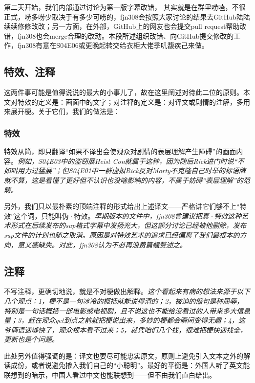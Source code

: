 \documentclass{ctexart}
\begin{document}
第二天开始，我们内部通过讨论为第一版字幕改错，{\color{red} 其实就是在群里唠嗑，不很正式，唠多唠少取决于有多少可唠的}，fjn308会按照大家讨论的结果去GitHub陆陆续续修修改改；另一方面，在外部，GitHub上的网友也会提交pull request帮助改错，fjn308也会merge合理的改动。本段所述组织改错、向GitHub提交修改的工作，fjn308有意在S04E06或更晚起转交给衣柜大佬季叽馥疾己来做。

\subsection{特效、注释}

这两件事可能是值得说说的最大的小事儿了，故在这里阐述对待此二位的原则。本文对特效的定义是：画面中的文字；对注释的定义是：对译文或剧情的注解，多用来展开梗。关于它们，我们的做法是：

\subsubsection{特效}

特效从简，即只翻译“如果不译出会使观众对剧情的表层理解产生障碍”的画面内容。\emph{\small 例如，S04E03中的盗窃展Heist Con就属于这种，因为随后Rick进门时说“不如叫用力过猛展”；但S04E01中一群虚拟Rick反对Morty不克隆自己时举的标语牌就不算，这是看懂了更好但不认识也没啥影响的内容，不属于妨碍“表层理解”的范畴。}

另外，我们只以最朴素的顶端注释的形式给出上述译文——严格讲它们够不上“特效”这个词，只能叫伪·特效。\emph{\small 早期版本的文件中，fjn308曾建议把真·特效这种艺术形式在后续发布的sup格式字幕中发扬光大，但这部分讨论已经被他删除，发布sup文件的计划也随之取消。原因是对特效艺术的追求已经偏离了我们最根本的方向，意义感缺失。对此，fjn308认为不必再浪费篇幅赘述之。}

\subsection{注释}

不写注释，更确切地说，就是不对梗做出解释。\emph{\small 这个看起来有病的想法来源于以下几个观点：1，梗不是一句冰冷的概括就能说得清的；2，被迫的缩句是种屈辱，特别是一句话概括一部电影或电视剧，且不说这也不能给没看过的人带来多大信息量；3，赶在观众get到点之前就把梗说出来，多妙的梗都会瞬间变得无趣；4，这爷俩语速够快了，观众根本看不过来；5，就凭咱们几个找，很难把梗快速找全，更新也是个问题。}

{\color{red} 此处另外值得强调的是：译文也要尽可能忠实原文，原则上避免引入文本之外的解读成份，或者说避免掺入我们自己的“小聪明”。最好的平衡是：外国人听了英文能联想到的暗示，中国人看过中文也能联想到——但不由我们直白给出。}
\end{document}
